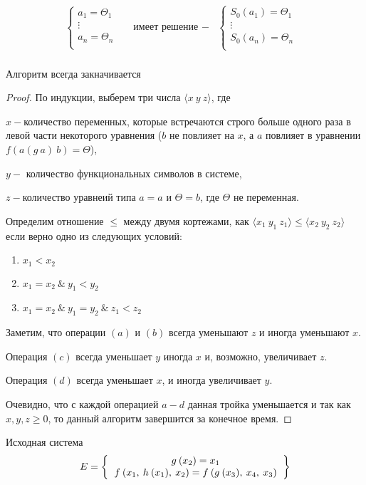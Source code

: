 	\begin{align*}
		\begin{cases}
			a_1=\Theta_1&\\
			\vdots&\\
			a_n=\Theta_n&\\
		\end{cases} & \text{имеет решение }-&\begin{cases}
			S_0(a_1)=\Theta_1&\\
			\vdots&\\
			S_0(a_n)=\Theta_n&\\
		\end{cases}\\
	\end{align*}
	\begin{statement}Алгоритм всегда закначивается\end{statement}
	\begin{proof}По индукции, выберем три числа $ \big \langle x\:y\:z\big \rangle$, где\par $x-$количество переменных, которые встречаются строго больше одного раза в левой части некоторого уравнения ($b$ не повлияет на $x$, а $a$ повлияет в уравнении $f(a(g\:a)\:b)=\Theta$),\par $y-$ количество функциональных символов в системе,\par $z-$количество уравнеий типа $a=a$ и $\Theta=b$, где $\Theta$ не переменная.\par Определим отношение $\leq$  между двумя кортежами,	 как $\big \langle x_1\:y_1\:z_1\big \rangle \leq \big \langle x_2\:y_2\:z_2\big \rangle$ если верно одно из следующих условий: \begin{enumerate}
	\item $x_1 < x_2$
	\item $x_1 = x_2 \:\& \:y_1 < y_2$
	\item $x_1 = x_2 \:\&  \:y_1 = y_2 \:\& \:z_1 < z_2$
	\end{enumerate}
		Заметим, что операции $(a)$ и $(b)$ всегда уменьшают $z$ и иногда уменьшают $x$.\par Операция $(c)$ всегда уменьшает $y$ иногда $x$ и, возможно, увеличивает $z$.\par Операция $(d)$ всегда уменьшает $x$, и иногда увеличивает $y$.\par
		Очевидно, что с каждой операцией $a-d$ данная тройка уменьшается и так как $x,y,z\geq 0$, то данный алгоритм завершится за конечное время.
		\end{proof}
		\begin{example}\end{example}
			Исходная система
		\[
		E=
			\left \{
			\begin{tabular}{c}
				$g\:(x_2)=x_1$\\
				$f\:(x_1,\: h\: (x_1),\: x_2)=f\:(g\:(x_3),\: x_4,\: x_3)$
			\end{tabular}
			\right \}
		\]

